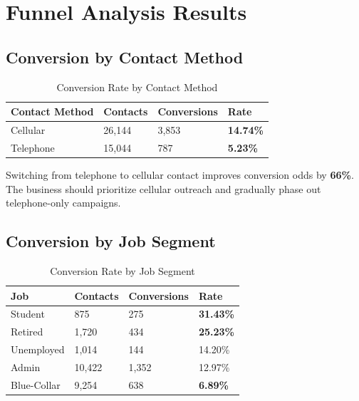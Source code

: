 \documentclass[11pt,a4paper]{article}
\begin{document}
\section{Funnel Analysis Results}

\subsection{Conversion by Contact Method}

\begin{table}[H]
\centering
\begin{tabular}{p{4cm} p{2.5cm} p{2.5cm} p{2.5cm}}
\toprule
\rowcolor{primary!10}
\textbf{Contact Method} & \textbf{Contacts} & \textbf{Conversions} & \textbf{Rate} \\
\midrule
\rowcolor{conversiongreen!15}
Cellular & 26,144 & 3,853 & \textcolor{conversiongreen}{\textbf{14.74\%}} \\
\rowcolor{dropred!15}
Telephone & 15,044 & 787 & \textcolor{dropred}{\textbf{5.23\%}} \\
\bottomrule
\end{tabular}
\caption{Conversion Rate by Contact Method}
\end{table}

\begin{tcolorbox}[
    colback=conversiongreen!5,
    colframe=conversiongreen!50,
    title=\textbf{Key Finding: Cellular is 3$\times$ More Effective},
    fonttitle=\bfseries,
    arc=6pt
]
Switching from telephone to cellular contact improves conversion odds by \textbf{66\%}. The business should prioritize cellular outreach and gradually phase out telephone-only campaigns.
\end{tcolorbox}

\subsection{Conversion by Job Segment}

\begin{table}[H]
\centering
\begin{tabular}{p{4cm} p{2.5cm} p{2.5cm} p{2.5cm}}
\toprule
\rowcolor{primary!10}
\textbf{Job} & \textbf{Contacts} & \textbf{Conversions} & \textbf{Rate} \\
\midrule
\rowcolor{conversiongreen!15}
Student & 875 & 275 & \textcolor{conversiongreen}{\textbf{31.43\%}} \\
Retired & 1,720 & 434 & \textcolor{conversiongreen}{\textbf{25.23\%}} \\
Unemployed & 1,014 & 144 & 14.20\% \\
Admin & 10,422 & 1,352 & 12.97\% \\
\rowcolor{dropred!15}
Blue-Collar & 9,254 & 638 & \textcolor{dropred}{\textbf{6.89\%}} \\
\bottomrule
\end{tabular}
\caption{Conversion Rate by Job Segment}
\end{table}
\end{document}
